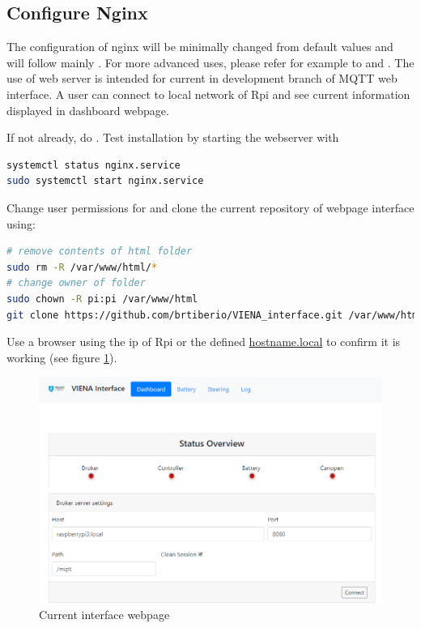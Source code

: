 \subsection{Configure Nginx}
The configuration of nginx will be minimally changed from default values and will follow mainly \cite{raspberry_nginx}. For more advanced uses, please refer for example to \cite{nginx_digitalocean} and \cite{nginx_wiki}. The use of web server is intended for current in development branch of \gls{MQTT} web interface. A user can connect to local network of \gls{Rpi} and see current information displayed in dashboard webpage.

If not already, do . Test installation by starting the webserver with
\begin{lstlisting}[frame=none,language=bash,backgroundcolor=\color{gray!15},numbers=none,		basicstyle=\ttfamily]
systemctl status nginx.service
sudo systemctl start nginx.service
\end{lstlisting}
Change user permissions for  and clone the current repository of webpage interface using:
\begin{lstlisting}[frame=none,language=bash,backgroundcolor=\color{gray!15},numbers=none,		basicstyle=\ttfamily]
# remove contents of html folder
sudo rm -R /var/www/html/*
# change owner of folder
sudo chown -R pi:pi /var/www/html
git clone https://github.com/brtiberio/VIENA_interface.git /var/www/html
\end{lstlisting}
Use a browser using the ip of \gls{Rpi} or the defined \hyperref[tab:suggested_config]{hostname.local} to confirm it is working (see figure \ref{fig:interface_viena}).
\begin{figure}[!hb]
	\centering
	\includegraphics[width=0.7\linewidth]{figures/viena_interface}
	\caption{Current interface webpage}
	\label{fig:interface_viena}
\end{figure}

